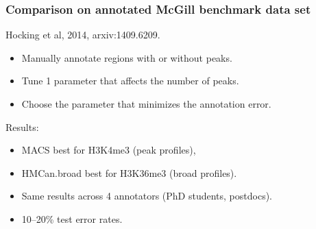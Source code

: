 \documentclass{beamer}
\begin{document}










\begin{frame}
  \frametitle{Comparison on annotated McGill benchmark data set}
  Hocking et al, 2014, arxiv:1409.6209.
  \begin{itemize}
  \item Manually annotate regions with or without peaks.
  \item Tune 1 parameter that affects the number of peaks.
  \item Choose the parameter that minimizes the annotation error.
  \end{itemize}
  Results:
  \begin{itemize}
  \item MACS best for H3K4me3 (peak profiles),
  \item HMCan.broad best for H3K36me3 (broad profiles).
  \item Same results across 4 annotators (PhD students, postdocs).
  \item 10--20\% test error rates.
  \end{itemize}
\end{frame}
\end{document}
